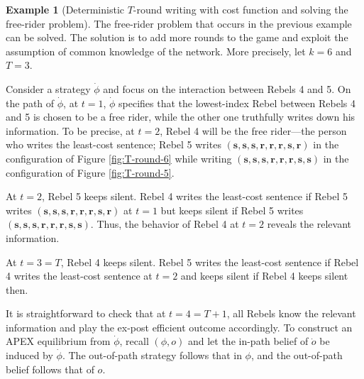 \documentclass[12pt,letter]{article}
\newcommand\omicron{o}
\theoremstyle{definition}
\newtheorem{example}{Example}
\theoremstyle{remark}
\theoremstyle{claim}
\begin{document}
\begin{example}[Deterministic $T$-round writing with cost function and solving the free-rider problem]
\label{ex:cost_function_talk_solve_fr}
The free-rider problem that occurs in the previous example can be solved. The solution is to add more rounds to the game and exploit the assumption of common knowledge of the network. More precisely, let $k=6$ and $T=3$. 

Consider a strategy $\dot{\phi}$ and focus on the interaction between Rebels 4 and 5. On the path of $\dot{\phi}$, at $t=1$, $\dot{\phi}$ specifies that the lowest-index Rebel between Rebels 4 and 5 is chosen to be a free rider, while the other one truthfully writes down his information. To be precise, at $t=2$, Rebel 4 will be the free rider---the person who writes the least-cost sentence; Rebel 5 writes $(\textbf{s},\textbf{s},\textbf{s},\textbf{r},\textbf{r},\textbf{r},\textbf{s},\textbf{r})$ in the configuration of Figure \ref{fig:T-round-6} while writing $(\textbf{s},\textbf{s},\textbf{s},\textbf{r},\textbf{r},\textbf{r},\textbf{s},\textbf{s})$ in the configuration of Figure \ref{fig:T-round-5}. 

At $t=2$, Rebel 5 keeps silent. Rebel 4 writes the least-cost sentence if Rebel 5 writes $(\textbf{s},\textbf{s},\textbf{s},\textbf{r},\textbf{r},\textbf{r},\textbf{s},\textbf{r})$ at $t=1$ but keeps silent if Rebel 5 writes $(\textbf{s},\textbf{s},\textbf{s},\textbf{r},\textbf{r},\textbf{r},\textbf{s},\textbf{s})$. Thus, the behavior of Rebel 4 at $t=2$ reveals the relevant information. 

At $t=3=T$, Rebel 4 keeps silent. Rebel 5 writes the least-cost sentence if Rebel 4 writes the least-cost sentence at $t=2$ and keeps silent if Rebel 4 keeps silent then. 

It is straightforward to check that at $t=4=T+1$, all Rebels know the relevant information and play the ex-post efficient outcome accordingly. To construct an APEX equilibrium from $\dot{\phi}$, recall $(\phi,\omicron)$ and let the in-path belief of $\dot{\omicron}$ be induced by $\dot{\phi}$. The out-of-path strategy follows that in $\phi$, and the out-of-path belief follows that of $\omicron$.   


\end{example}
\end{document}
